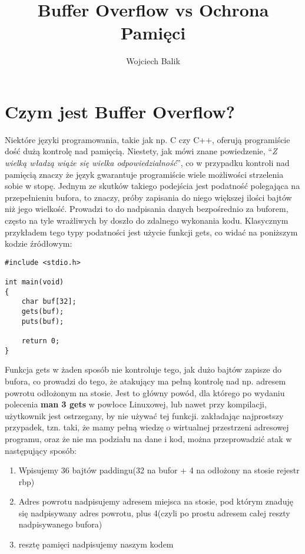 \documentclass[polish]{kbk}
\begin{document}
\author{Wojciech Balik}
\title{Buffer Overflow vs Ochrona Pamięci}


\maketitle


\section{Czym jest Buffer Overflow?}
Niektóre języki programowania, takie jak np. C czy C++, oferują programiście
dość dużą kontrolę nad pamięcią. Niestety, jak mówi znane powiedzenie,
 ``\emph{Z wielką władzą wiąże się wielka odpowiedzialność}'', co w przypadku kontroli 
 nad pamięcią znaczy że język gwarantuje 
programiście wiele możliwości strzelenia sobie w stopę.
Jednym ze skutków takiego podejścia jest podatność polegająca na przepełnieniu bufora, to znaczy, próby zapisania do niego większej ilości bajtów niż jego wielkość. Prowadzi to do nadpisania danych bezpośrednio za buforem, często na tyle wrażliwych by doszło do zdalnego wykonania kodu. \newline
\newline
Klasycznym przykładem tego typy podatności jest użycie funkcji gets, co widać na poniższym kodzie źródłowym:
\begin{lstlisting}
#include <stdio.h>

int main(void)
{
    char buf[32];
    gets(buf);
    puts(buf);

    return 0;
}
\end{lstlisting}
Funkcja gets w żaden sposób nie kontroluje tego, jak dużo bajtów zapisze do bufora, co prowadzi do tego, że atakujący ma pełną kontrolę nad np. adresem powrotu odłożonym na stosie. Jest to główny powód, dla którego po wydaniu polecenia \textbf{man 3 gets} w powłoce Linuxowej, lub nawet przy kompilacji, użytkownik jest ostrzegany, by nie używać tej funkcji.\newline
zakładając najprostszy przypadek, tzn. taki, że mamy pełną wiedzę o wirtualnej przestrzeni adresowej programu, oraz że nie ma podziału na dane i kod, można przeprowadzić atak w następujący sposób:
\begin{enumerate}
\item Wpisujemy 36 bajtów paddingu(32 na bufor + 4 na odłożony na stosie rejestr rbp)
\item Adres powrotu nadpisujemy adresem miejsca na stosie, pod którym znaduję się nadpisywany adres powrotu, plus 4(czyli po prostu adresem całej reszty nadpisywanego bufora)
\item resztę pamięci nadpisujemy naszym kodem
\end{enumerate}
\end{document}
